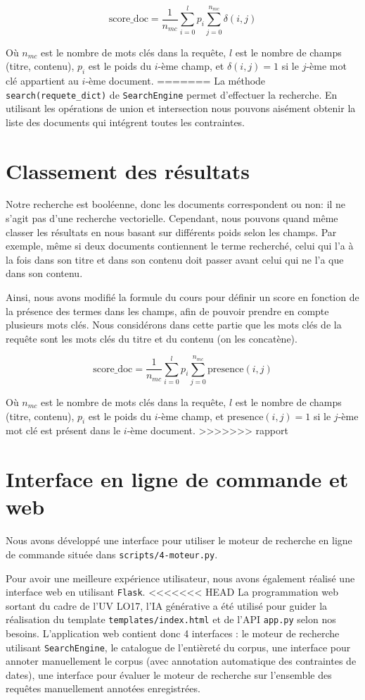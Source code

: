 \[
    \text{score\_doc} = \frac{1}{n_{mc}}\sum_{i = 0}^{l} p_i \sum_{j = 0}^{n_{mc}} \delta(i, j)
\]

Où $n_{mc}$ est le nombre de mots clés dans la requête, $l$ est le nombre de champs (titre, contenu), $p_i$ est le poids du $i$-ème champ, et $\delta(i, j) = 1$ si le $j$-ème mot clé appartient au $i$-ème document.
=======
La méthode \texttt{search(requete\_dict)} de \texttt{SearchEngine} permet d'effectuer la recherche. En utilisant les opérations de union et intersection nous pouvons aisément obtenir la liste des documents qui intégrent toutes les contraintes. 

\section{Classement des résultats}

Notre recherche est booléenne, donc les documents correspondent ou non: il ne s'agit pas d'une recherche vectorielle. Cependant, nous pouvons quand même classer les résultats en nous basant sur différents poids selon les champs. Par exemple, même si deux documents contiennent le terme recherché, celui qui l'a à la fois dans son titre et dans son contenu doit passer avant celui qui ne l'a que dans son contenu.

Ainsi, nous avons modifié la formule du cours pour définir un score en fonction de la présence des termes dans les champs, afin de pouvoir prendre en compte plusieurs mots clés.
Nous considérons dans cette partie que les mots clés de la requête sont les mots clés du titre et du contenu (on les concatène).

\[
    \text{score\_doc} = \frac{1}{n_{mc}}\sum_{i = 0}^{l} p_i \sum_{j = 0}^{n_{mc}} \text{presence}(i, j)
\]

Où $n_{mc}$ est le nombre de mots clés dans la requête, $l$ est le nombre de champs (titre, contenu), $p_i$ est le poids du $i$-ème champ, et $\text{presence}(i, j) = 1$ si le $j$-ème mot clé est présent dans le $i$-ème document.
>>>>>>> rapport

\section{Interface en ligne de commande et web}

Nous avons développé une interface pour utiliser le moteur de recherche en ligne de commande située dans \texttt{scripts/4-moteur.py}. 

Pour avoir une meilleure expérience utilisateur, nous avons également réalisé une interface web en utilisant \texttt{Flask}. 
<<<<<<< HEAD
La programmation web sortant du cadre de l'UV LO17, l'IA générative a été utilisé pour guider la réalisation du template \texttt{templates/index.html} et de l'API \texttt{app.py} selon nos besoins.
L'application web contient donc 4 interfaces : le moteur de recherche utilisant \texttt{SearchEngine}, le catalogue de l'entièreté du corpus, une interface pour annoter manuellement le corpus (avec annotation automatique des contraintes de dates), une interface pour évaluer le moteur de recherche sur l'ensemble des requêtes manuellement annotées enregistrées.  

